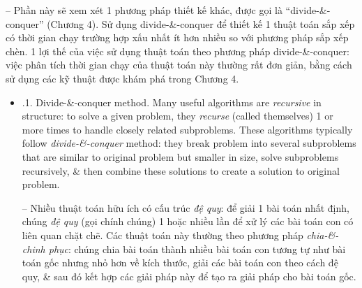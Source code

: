 \documentclass{article}
\begin{document}
\begin{itemize}
\begin{itemize}
\begin{itemize}
            -- Phần này sẽ xem xét 1 phương pháp thiết kế khác, được gọi là ``divide-\&-conquer'' (Chương 4). Sử dụng divide-\&-conquer để thiết kế 1 thuật toán sắp xếp có thời gian chạy trường hợp xấu nhất ít hơn nhiều so với phương pháp sắp xếp chèn. 1 lợi thế của việc sử dụng thuật toán theo phương pháp divide-\&-conquer: việc phân tích thời gian chạy của thuật toán này thường rất đơn giản, bằng cách sử dụng các kỹ thuật được khám phá trong Chương 4.
            \begin{itemize}
                \item {.1. Divide-\&-conquer method.} Many useful algorithms are {\it recursive} in structure: to solve a given problem, they {\it recurse} (called themselves) 1 or more times to handle closely related subproblems. These algorithms typically follow {\it divide-\&-conquer} method: they break problem into several subproblems that are similar to original problem but smaller in size, solve subproblems recursively, \& then combine these solutions to create a solution to original problem.
                
                -- Nhiều thuật toán hữu ích có cấu trúc {\it đệ quy}: để giải 1 bài toán nhất định, chúng {\it đệ quy} (gọi chính chúng) 1 hoặc nhiều lần để xử lý các bài toán con có liên quan chặt chẽ. Các thuật toán này thường theo phương pháp {\it chia-\&-chinh phục}: chúng chia bài toán thành nhiều bài toán con tương tự như bài toán gốc nhưng nhỏ hơn về kích thước, giải các bài toán con theo cách đệ quy, \& sau đó kết hợp các giải pháp này để tạo ra giải pháp cho bài toán gốc.
                

\end{itemize}
\end{itemize}
\end{itemize}
\end{itemize}
\end{document}
